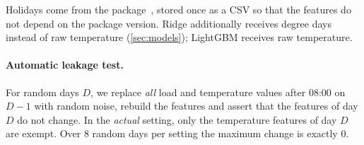 Holidays come from the  package~\cite{holidays_python}, stored once as a CSV so that the
features do not depend on the package version. Ridge additionally receives degree days instead of
raw temperature (\cref{sec:models}); LightGBM receives raw temperature.

\paragraph{Automatic leakage test.}
For random days $D$, we replace \emph{all} load and temperature values after 08:00 on $D-1$ with
random noise, rebuild the features and assert that the features of day $D$ do not change. In the
\emph{actual} setting, only the temperature features of day $D$ are exempt. Over 8 random days per
setting the maximum change is exactly 0.
